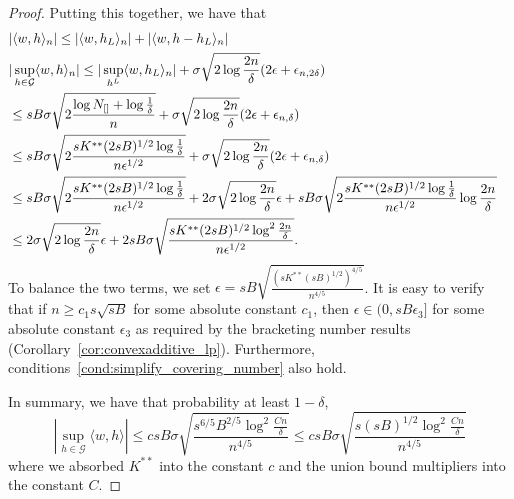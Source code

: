 \begin{proof}
Putting this together, we have that
\begin{align*}
\lefteqn{|\langle w, h \rangle_n | \leq | \langle w, h_L\rangle_n| + |\langle w, h - h_L\rangle_n|}\\
\lefteqn{|\sup_{h \in \mathcal{G}} \langle w, h \rangle_n| \leq 
     | \sup_{h^L} \langle w, h_L \rangle_n | + \sigma \sqrt{2 \log \frac{2n}{\delta}} (2\epsilon + \epsilon_{n, 2\delta})} \\
   &\leq   sB \sigma \sqrt{ 2 \frac{ \log N_{[]} + \log \frac{1}{\delta}}{n}} + \sigma \sqrt{2 \log \frac{2n}{\delta}} (2\epsilon + \epsilon_{n, \delta}) \\
   &\leq  sB \sigma \sqrt{ 2 \frac{sK^{**} (2sB)^{1/2} \log \frac{1}{\delta}}{n \epsilon^{1/2}}} +
   \sigma \sqrt{ 2\log \frac{2n}{\delta}} (2\epsilon + \epsilon_{n, \delta}) \\
   &\leq sB \sigma \sqrt{ 2\frac{sK^{**} (2sB)^{1/2} \log \frac{1}{\delta}}{n \epsilon^{1/2}}} +
   2\sigma\sqrt{2 \log \frac{2n}{\delta}} \epsilon + sB \sigma \sqrt{2 \frac{sK^{**} (2sB)^{1/2}\log \frac{1}{\delta}}{n \epsilon^{1/2}} \log \frac{2n}{\delta}} \\
   &\leq 2\sigma\sqrt{2\log \frac{2n}{\delta}} \epsilon + 2 sB \sigma \sqrt{ \frac{sK^{**} (2sB)^{1/2} \log^2 \frac{2n}{\delta}}{n \epsilon^{1/2}}}.
\end{align*}
To balance the two terms, we set $\epsilon = sB \sqrt{ \frac{(s
    K^{**} (sB)^{1/2})^{4/5}}{n^{4/5}} }$. It is easy to verify that
if $n \geq c_1 s \sqrt{sB}$ for some absolute constant $c_1$, then 
$\epsilon \in (0, sB \epsilon_3]$ for some absolute constant $\epsilon_3$ as required by the bracketing number results (Corollary~\ref{cor:convexadditive_lp}). Furthermore, conditions~\eqref{cond:simplify_covering_number} also hold. 


In summary, we have that probability at least $1-\delta$,
\[
|\sup_{h \in \mathcal{G}} \langle w, h \rangle | \leq c sB \sigma \sqrt{ 
   \frac{s^{6/5} B^{2/5} \log^2 \frac{Cn}{\delta}}{n^{4/5}}} \leq 
  c sB \sigma \sqrt{ 
   \frac{s (sB)^{1/2} \log^2 \frac{Cn}{\delta}}{n^{4/5}}}
\]
where we absorbed $K^{**}$ into the constant $c$ and the union bound multipliers into the constant $C$.


\end{proof}
